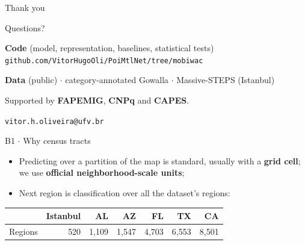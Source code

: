 \documentclass{beamer}
\begin{document}
\begin{frame}{Thank you}
    \vspace{0pt}%
    \begin{center}
        {\Large Questions?}\par
        \bigskip\bigskip
        \textbf{Code} (model, representation, baselines, statistical tests)\\
        \texttt{github.com/VitorHugoOli/PoiMtlNet/tree/mobiwac}\par
        \medskip
        \textbf{Data} (public) $\cdot$ category-annotated Gowalla $\cdot$ Massive-STEPS (Istanbul)\par
        \bigskip
        {\small Supported by \textbf{FAPEMIG}, \textbf{CNPq} and \textbf{CAPES}.}\par
        \medskip
        {\footnotesize \texttt{vitor.h.oliveira@ufv.br}}
    \end{center}
\end{frame}

\appendix
\miniframesoff

\begin{frame}{B1 $\cdot$ Why census tracts}
    \vspace{0pt}%
    \begin{itemize}\setlength{\itemsep}{2ex}
        \item Predicting over a partition of the map is standard, usually with a \textbf{grid cell};
              we use \textbf{official neighborhood-scale units};
        \item Next region is classification over all the dataset's regions:
    \end{itemize}
    \begin{center}
    \small
    \setlength{\tabcolsep}{7pt}
    \begin{tabular}{@{}lrrrrrr@{}}
        \toprule
        & Istanbul & AL & AZ & FL & TX & CA \\
        \midrule
        Regions & 520 & 1,109 & 1,547 & 4,703 & 6,553 & 8,501 \\
        \bottomrule
    \end{tabular}
    \end{center}
\end{frame}
\end{document}
